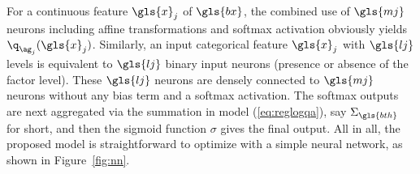 For a continuous feature $\gls{x}_j$ of $\gls{bx}$, the combined use of $\gls{mj}$ neurons including affine transformations and softmax activation obviously yields $\q_{\ag_{j}}(\gls{x}_j)$. Similarly, an input categorical feature $\gls{x}_j$ with $\gls{lj}$ levels is equivalent to $\gls{lj}$ binary input neurons (presence or absence of the factor level). These $\gls{lj}$ neurons are densely connected to $\gls{mj}$ neurons without any bias term and a softmax activation. The softmax outputs are next aggregated via the summation in model (\ref{eq:reglogqa}), say $\Sigma_{\gls{bth}}$ for short, and then the sigmoid function $\sigma$ gives the final output. All in all, the proposed model is straightforward to optimize with a simple neural network, as shown in Figure~\ref{fig:nn}.


\def\layersep{2.5cm}

